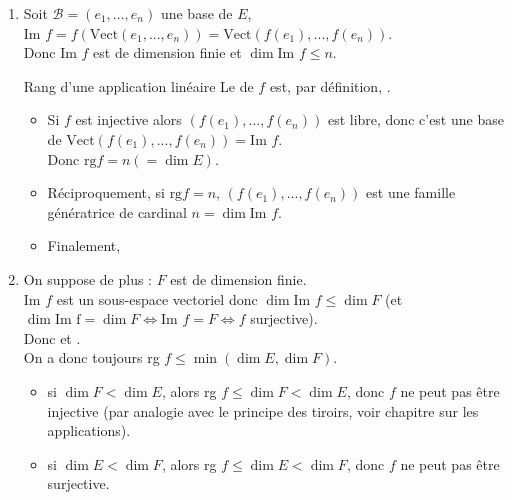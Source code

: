 \documentclass[12pt, a4paper]{report}
\begin{document}
\begin{enumerate}
	\item Soit $\mathcal{B} = (e_1,...,e_n)$ une base de $E$, \\
	$\text{Im } f = f(\text{Vect}(e_1,...,e_n)) = \text{Vect}(f(e_1),...,f(e_n))$. \\
	Donc $\text{Im } f$ est de dimension finie et $\dim \text{Im }f \le n$. \\
	
	\begin{definition}{Rang d'une application linéaire}{}
	Le  de $f$ est, par définition, .
	\end{definition}
	
	\begin{itemize}
		\item Si $f$ est injective alors $(f(e_1),...,f(e_n))$ est libre, donc c'est une base de $\text{Vect}(f(e_1),...,f(e_n)) = \text{Im }f$. \\
		Donc $\text{rg} f = n (= \dim E)$.
		
		\item Réciproquement, si $\text{rg} f = n$, $(f(e_1),...,f(e_n))$ est une famille génératrice de cardinal $n = \dim \text{Im } f$.
		
		\item Finalement, 
	\end{itemize}

	\item On suppose de plus : $F$ est de dimension finie. \\
	$\text{Im }f$ est un sous-espace vectoriel donc $\dim \text{Im }f \le \dim F$ (et $\dim \text{Im f} = \dim F \Longleftrightarrow \text{Im } f = F \Longleftrightarrow f$ surjective). \\
	Donc  et . \\
	
	On a donc toujours rg $f \le \min(\dim E, \dim F)$. 
	\begin{itemize}
		\item si $\dim F < \dim E$, alors rg $f \le \dim F < \dim E$, donc $f$ ne peut pas être injective (par analogie avec le principe des tiroirs, voir chapitre sur les applications).
		
		\item si $\dim E < \dim F$, alors rg $f \le \dim E < \dim F$, donc $f$ ne peut pas être surjective. 
		

\end{itemize}
\end{enumerate}
\end{document}
